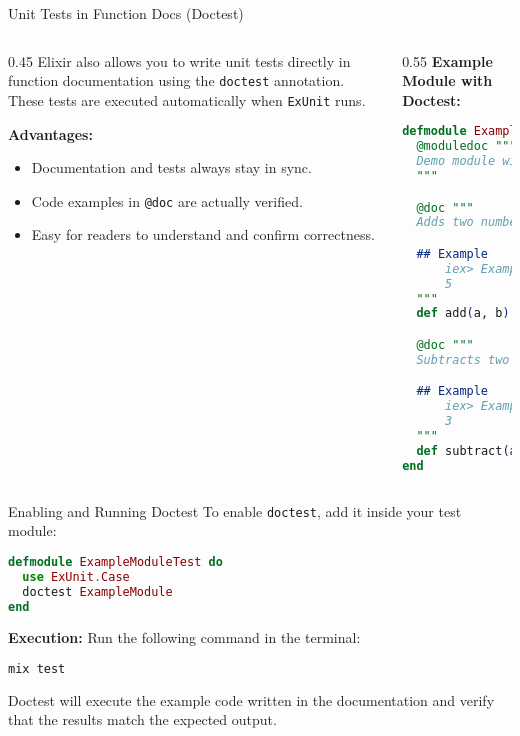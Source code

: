 \documentclass[aspectratio=169, table]{beamer}
\begin{document}
\begin{frame}[fragile]{Unit Tests in Function Docs (Doctest)}
\vspace{20pt}
\begin{columns}

\begin{column}[t]{0.45\textwidth}
Elixir also allows you to  
write unit tests directly in function documentation using the  
\texttt{doctest} annotation. These tests are executed automatically  
when \texttt{ExUnit} runs.  

\vspace{10pt}
\textbf{Advantages:}
\begin{itemize}
  \item Documentation and tests always stay in sync.  
  \item Code examples in \texttt{@doc} are actually verified.  
  \item Easy for readers to understand and confirm correctness.  
\end{itemize}
\end{column}

\begin{column}[t]{0.55\textwidth}
\textbf{Example Module with Doctest:}
\begin{lstlisting}[language=Elixir, basicstyle=\ttfamily\tiny]
defmodule ExampleModule do
  @moduledoc """
  Demo module with documentation and tests.
  """

  @doc """
  Adds two numbers.

  ## Example
      iex> ExampleModule.add(2, 3)
      5
  """
  def add(a, b), do: a + b

  @doc """
  Subtracts two numbers.

  ## Example
      iex> ExampleModule.subtract(5, 2)
      3
  """
  def subtract(a, b), do: a - b
end
\end{lstlisting}
\end{column}

\end{columns}
\end{frame}



\begin{frame}[fragile]{Enabling and Running Doctest}
\vspace{15pt}
To enable \texttt{doctest}, add it inside your test module:  

\begin{lstlisting}[language=Elixir, basicstyle=\ttfamily\scriptsize]
defmodule ExampleModuleTest do
  use ExUnit.Case
  doctest ExampleModule
end
\end{lstlisting}

\vspace{10pt}
\textbf{Execution:} Run the following command in the terminal:  

\begin{lstlisting}[language=bash]
mix test
\end{lstlisting}

Doctest will execute the example code written in the documentation  
and verify that the results match the expected output.
\end{frame}
\end{document}
